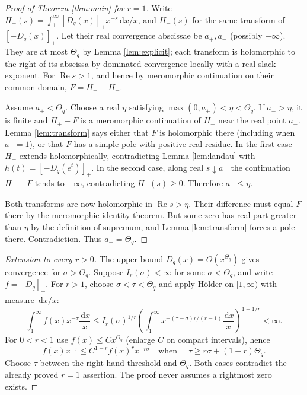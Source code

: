 \documentclass[11pt]{article}
\newcommand{\Rea}{\operatorname{Re}}
\newcommand{\pp}[1]{[#1]_+}
\newcommand{\dd}{\,\mathrm d}
\begin{document}
\begin{proof}[Proof of Theorem \ref{thm:main} for $r=1$]
Write $H_+(s)=\int_1^\infty\pp{D_q(x)}x^{-s}\dd x/x$, and $H_-(s)$ for the same transform of $\pp{-D_q(x)}$. Let their real convergence abscissae be $a_+,a_-$ (possibly $-\infty$). They are at most $\Theta_q$ by Lemma \ref{lem:explicit}; each transform is holomorphic to the right of its abscissa by dominated convergence locally with a real slack exponent. For $\Rea s>1$, and hence by meromorphic continuation on their common domain, $F=H_+-H_-$.

Assume $a_+<\Theta_q$. Choose a real $\eta$ satisfying $\max(0,a_+)<\eta<\Theta_q$. If $a_->\eta$, it is finite and $H_+-F$ is a meromorphic continuation of $H_-$ near the real point $a_-$. Lemma \ref{lem:transform} says either that $F$ is holomorphic there (including when $a_-=1$), or that $F$ has a simple pole with positive real residue. In the first case $H_-$ extends holomorphically, contradicting Lemma \ref{lem:landau} with $h(t)=\pp{-D_q(e^t)}$. In the second case, along real $s\downarrow a_-$ the continuation $H_+-F$ tends to $-\infty$, contradicting $H_-(s)\ge0$. Therefore $a_-\le\eta$.

Both transforms are now holomorphic in $\Rea s>\eta$. Their difference must equal $F$ there by the meromorphic identity theorem. But some zero has real part greater than $\eta$ by the definition of supremum, and Lemma \ref{lem:transform} forces a pole there. Contradiction. Thus $a_+=\Theta_q$.
\end{proof}

\begin{proof}[Extension to every $r>0$]
The upper bound $D_q(x)=O(x^{\Theta_q})$ gives convergence for $\sigma>\Theta_q$. Suppose $I_r(\sigma)<\infty$ for some $\sigma<\Theta_q$, and write $f=\pp{D_q}$. For $r>1$, choose $\sigma<\tau<\Theta_q$ and apply H\"older on $[1,\infty)$ with measure $\dd x/x$:
\[
 \int_1^\infty f(x)x^{-\tau}\frac{\dd x}{x}
 \le I_r(\sigma)^{1/r}\left(\int_1^\infty x^{-(\tau-\sigma)r/(r-1)}\frac{\dd x}{x}\right)^{1-1/r}<\infty.
\]
For $0<r<1$ use $f(x)\le Cx^{\Theta_q}$ (enlarge $C$ on compact intervals), hence
\[
 f(x)x^{-\tau}\le C^{1-r} f(x)^r x^{-r\sigma}
 \quad\text{when }\quad \tau\ge r\sigma+(1-r)\Theta_q.
\]
Choose $\tau$ between the right-hand threshold and $\Theta_q$. Both cases contradict the already proved $r=1$ assertion. The proof never assumes a rightmost zero exists.
\end{proof}
\end{document}
